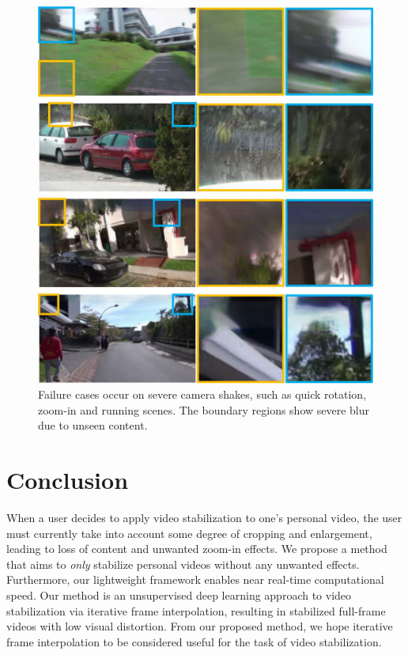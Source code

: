 \begin{figure}
	\includegraphics[width=1\linewidth,keepaspectratio]{failurecase}
	\vspace{-5mm}
	\caption{Failure cases occur on severe camera shakes, such as quick rotation, zoom-in and running scenes. 
	The boundary regions show severe blur due to unseen content.}
	\label{failurecase}
	\vspace{-2mm}
\end{figure}




\section{Conclusion}
When a user decides to apply video stabilization to one's personal video, the user must currently take into account some degree of cropping and enlargement, leading to loss of content and unwanted zoom-in effects.
We propose a method that aims to \emph{only} stabilize personal videos without any unwanted effects.
Furthermore, our lightweight framework enables near real-time computational speed.
Our method is an unsupervised deep learning approach to video stabilization via iterative frame interpolation, resulting in stabilized full-frame videos with low visual distortion.
From our proposed method, we hope iterative frame interpolation to be considered useful for the task of video stabilization.

